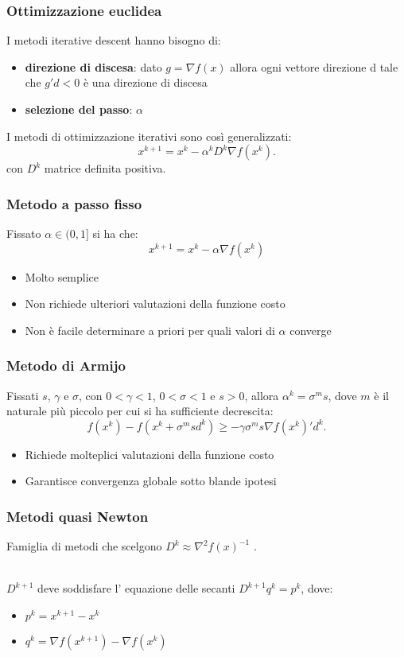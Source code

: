\documentclass{beamer}
\begin{document}
\begin{frame}
\frametitle{Ottimizzazione euclidea}
I metodi iterative descent hanno bisogno di:
\begin{itemize}
    \item \textbf{direzione di discesa}: dato $g = \nabla f(x)$ allora ogni vettore direzione d tale che $g'd < 0$ è una direzione di discesa
    \item \textbf{selezione del passo}: $\alpha$
\end{itemize}
I metodi di ottimizzazione iterativi sono così generalizzati:
\[x^{k+1} = x^k - \alpha^k D^k \nabla f(x^k).\]
con $D^k$ matrice definita positiva.
\end{frame}

\begin{frame}
\frametitle{Metodo a passo fisso}
Fissato $\alpha \in (0, 1]$ si ha che:
\[x^{k+1} = x^k - \alpha \nabla f(x^k)\]
\bigskip
\begin{itemize}
    \item Molto semplice
    \item Non richiede ulteriori valutazioni della funzione costo
    \item Non è facile determinare a priori per quali valori di $\alpha$ converge
\end{itemize}
\end{frame}

\begin{frame}
\frametitle{Metodo di Armijo}
Fissati $s$, $\gamma$ e  $\sigma$,  con $0 < \gamma < 1$, $0 < \sigma < 1$ e $s > 0$, allora $\alpha^k =\sigma^ms$, dove $m$ è il naturale più piccolo per cui si ha \alert{sufficiente decrescita}:
\[f(x^k) - f(x^k + \sigma^m s d^k) \geq -\gamma \sigma^m s \nabla f(x^k)'d^k.\]
\bigskip
\begin{itemize}
    \item Richiede molteplici valutazioni della funzione costo
    \item Garantisce convergenza globale sotto blande ipotesi
\end{itemize}
\end{frame}

\begin{frame}
\frametitle{Metodi quasi Newton}
Famiglia di metodi che scelgono $D^k \approx \nabla^2f(x)^{-1}$ .\\~\

$D^{k+1}$  deve soddisfare l' \alert{equazione delle secanti} $D^{k+1}q^k= p^k$, dove:
\begin{itemize}
    \item $p^k = x^{k+1} - x^k$
    \item $q^k = \nabla f(x^{k+1}) - \nabla f(x^k)$
\end{itemize}
\end{frame}
\end{document}
